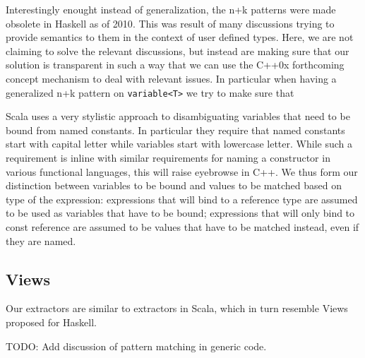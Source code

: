 \documentclass[preprint]{sigplanconf}
\DeclareRobustCommand{\code}[1]{{\lstinline[breaklines=false]{#1}}}
\begin{document}
Interestingly enought instead of generalization, the n+k patterns were made 
obsolete in Haskell as of 2010\cite{HaskelDocMakingThis}. This was result of 
many discussions trying to provide semantics to them in the context of user 
defined types. Here, we are not claiming to solve the relevant discussions, but 
instead are making sure that our solution is transparent in such a way that we 
can use the C++0x forthcoming concept mechanism to deal with relevant issues. In 
particular when having a generalized n+k pattern on \code{variable<T>} we try to make 
sure that 

Scala uses a very stylistic approach to disambiguating variables that need to be 
bound from named constants. In particular they require that named constants 
start with capital letter while variables start with lowercase 
letter\cite[]{EmirPhd}. While such a requirement is inline with similar 
requirements for naming a constructor in various functional languages, this will 
raise eyebrowse in C++. We thus form our distinction between variables to be 
bound and values to be matched based on type of the expression: expressions that 
will bind to a reference type are assumed to be used as variables that have to 
be bound; expressions that will only bind to const reference are assumed to be 
values that have to be matched instead, even if they are named.

\subsection{Views}

Our extractors are similar to extractors in Scala, which in turn resemble Views 
proposed for Haskell.

TODO: Add discussion of pattern matching in generic code.

\end{document}
